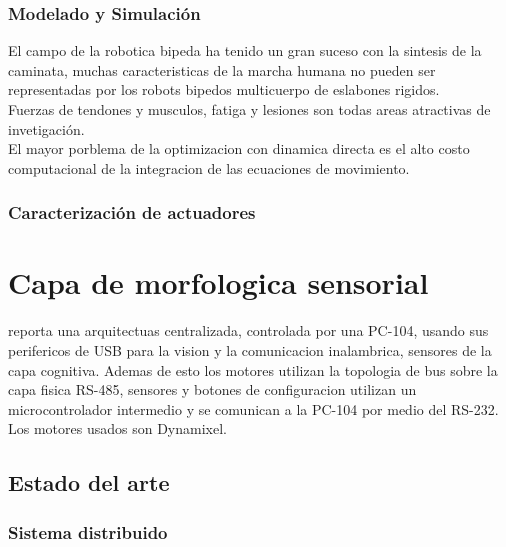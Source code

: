 \documentclass[10pt,onecolumn,twoside,letterpaper]{article}
\begin{document}
\subsubsection{Modelado y Simulaci\'on}
El campo de la robotica bipeda ha tenido un gran suceso con la sintesis de la caminata, muchas caracteristicas de la marcha humana no pueden ser representadas por los robots bipedos multicuerpo de eslabones rigidos.\\
Fuerzas de tendones y musculos, fatiga y lesiones son todas areas atractivas de invetigaci\'on.\\
El mayor porblema de la optimizacion con dinamica directa es el alto costo computacional de la integracion de las ecuaciones de movimiento.\cite{Xiang2010}\\
\href{run:/home/jackmaster/Downloads/Doc Thesis/Walkers/+[2010 Y Xiang and J S  Arora and K Abdel-Malek] Art Physics-based modeling and simulation of human walking: a review of optimization -based and other approches.pdf}{
}\cite{Xiang2010}
\subsubsection{Caracterizaci\'on de actuadores}
\section{Capa de morfologica sensorial}
\cite{Dong2009} reporta una arquitectuas centralizada, controlada por una PC-104, usando sus perifericos de USB para la vision y la comunicacion inalambrica, sensores de la capa cognitiva. Ademas de esto los motores utilizan la topologia de bus sobre la capa fisica RS-485, sensores y botones de configuracion utilizan un microcontrolador intermedio y se comunican a la PC-104 por medio del RS-232. Los motores usados son Dynamixel. 
\subsection{Estado del arte}
\subsubsection{Sistema distribuido}
\end{document}
